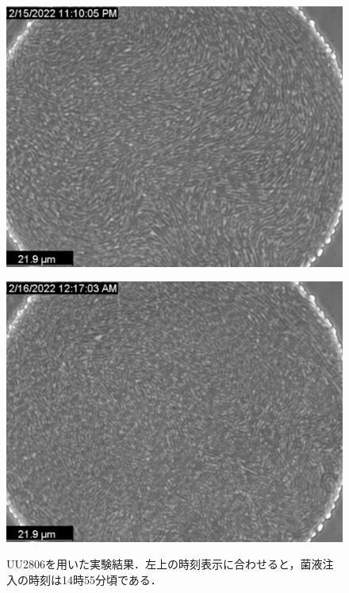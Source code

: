 \documentclass[a4paper,11pt,titlepage]{jsarticle}
\begin{document}
\begin{figure}[htbp]
\begin{minipage}{0.45\linewidth}
    \centering
    \includegraphics[width=\columnwidth]{Series015_t140000_RAW_ch00.pdf}
    \label{fig:06_3}
  \end{minipage}
  \begin{minipage}{0.45\linewidth}
    \centering
    \includegraphics[width=\columnwidth]{Series015_t180000_RAW_ch00.pdf}
    \label{fig:06_4}
  \end{minipage}
  \caption{UU2806を用いた実験結果．左上の時刻表示に合わせると，菌液注入の時刻は14時55分頃である．}
  \label{fig:06}
\end{figure}
\end{document}
